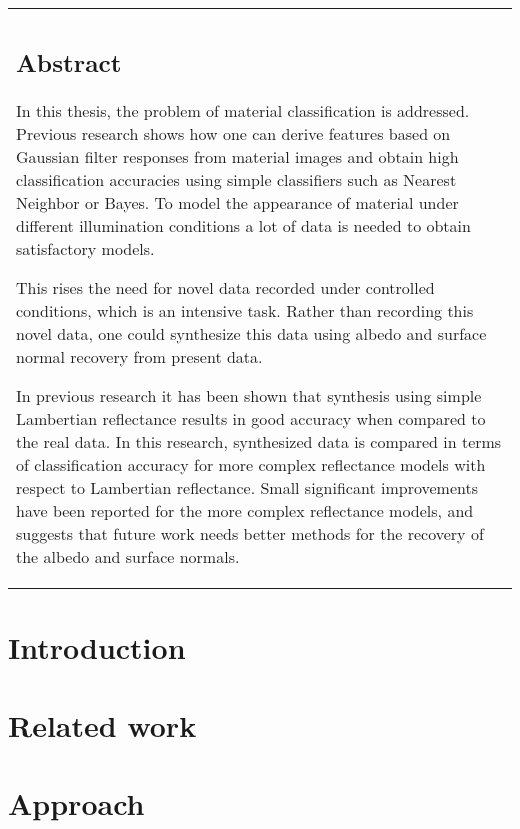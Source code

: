 \documentclass[11pt, a4paper,oneside]{book}
\begin{document}
	\thispagestyle{empty}
	\begin{center}
		\begin{tabular}{p{10cm}}
			\section*{Abstract}
			In this thesis, the problem of material classification is addressed. Previous research shows how one can derive features based on Gaussian filter responses from material images and obtain high classification accuracies using simple classifiers such as Nearest Neighbor or Bayes. To model the appearance of material under different illumination conditions a lot of data is needed to obtain satisfactory models. 

This rises the need for novel data recorded under controlled conditions, which is an intensive task. Rather than recording this novel data, one could synthesize this data using albedo and surface normal recovery from present data. 

In previous research it has been shown that synthesis using simple Lambertian reflectance results in good accuracy when compared to the real data. In this research, synthesized data is compared in terms of classification accuracy for more complex reflectance models with respect to Lambertian reflectance. Small significant improvements have been reported for the more complex reflectance models, and suggests that future work needs better methods for the recovery of the albedo and surface normals.
		\end{tabular}
	\end{center}

	\newpage
	\tableofcontents
	\newpage
	\hypersetup{pageanchor=true}
	\chapter{Introduction}
	
	\chapter{Related work}
	
	\chapter{Approach}
	
\end{document}
